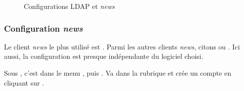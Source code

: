   \begin{figure}[!h]
    \begin{center}  
	\caption{Configurations LDAP et \emph{news}}
    \end{center}
 \end{figure}



\subsubsection{Configuration \emph{news}}

 Le client \emph{news} le plus utilisé est . Parmi les autres clients \emph{news}, citons  ou . Ici aussi, la configuration est presque indépendante du logiciel choisi.


Sous , c'est dans le menu , puis . Va dans la rubrique  et
crée un compte en cliquant sur .

